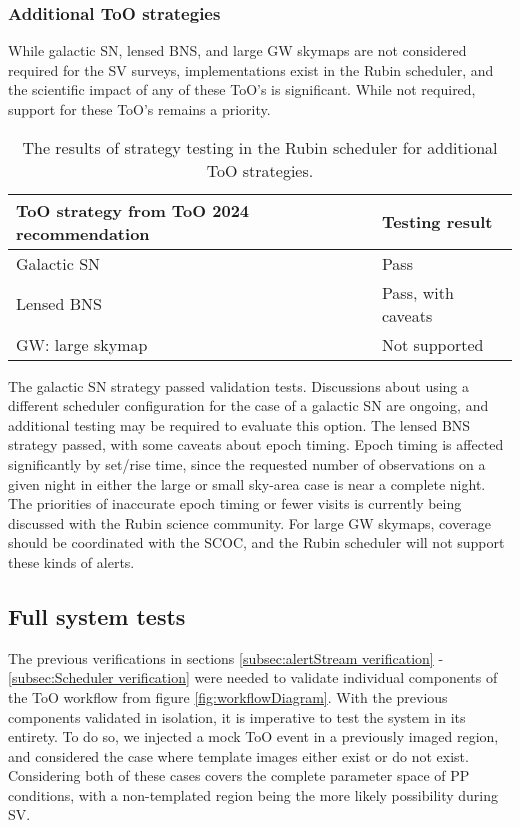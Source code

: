 \subsubsection{Additional ToO strategies}\label{subsubsec:SVOptionalValidation}

While galactic SN, lensed BNS, and large GW skymaps are not considered required for the SV surveys, implementations exist in the Rubin scheduler, and the scientific impact of any of these ToO's is significant. While not required, support for these ToO's remains a priority.

\begin{table}[]
\centering
\begin{tabular}{|l|l|}
\hline
ToO strategy from ToO 2024 recommendation & Testing result       \\ \hline
Galactic SN                              & Pass                 \\ \hline
Lensed BNS                              & Pass, with caveats                 \\ \hline
GW: large skymap                              & Not supported                 \\ \hline
\end{tabular}
\caption{The results of strategy testing in the Rubin scheduler for additional ToO strategies.}
\label{tab:SVOptionalStrategy results}
\end{table}

The galactic SN strategy passed validation tests. Discussions about using a different scheduler configuration for the case of a galactic SN are ongoing, and additional testing may be required to evaluate this option. The lensed BNS strategy passed, with some caveats about epoch timing. Epoch timing is affected significantly by set/rise time, since the requested number of observations on a given night in either the large or small sky-area case is near a complete night. The priorities of inaccurate epoch timing or fewer visits is currently being discussed with the Rubin science community. For large GW skymaps, coverage should be coordinated with the SCOC, and the Rubin scheduler will not support these kinds of alerts.

\subsection{Full system tests}\label{subsec:systemTests verification}

The previous verifications in sections \ref{subsec:alertStream verification} - \ref{subsec:Scheduler verification} were needed to validate individual components of the ToO workflow from figure \ref{fig:workflowDiagram}. With the previous components validated in isolation, it is imperative to test the system in its entirety. To do so, we injected a mock ToO event in a previously imaged region, and considered the case where template images either exist or do not exist. Considering both of these cases covers the complete parameter space of PP conditions, with a non-templated region being the more likely possibility during SV.

